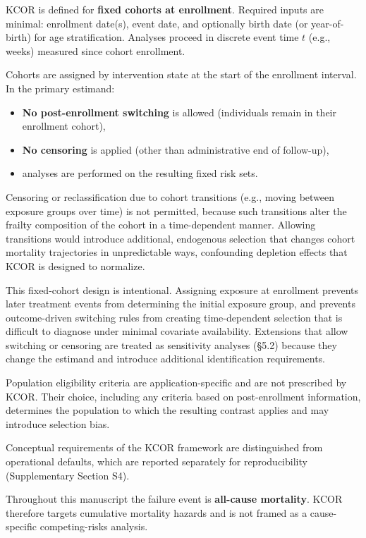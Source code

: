 \documentclass[
]{article}
\providecommand{\tightlist}{%
  \setlength{\itemsep}{0pt}\setlength{\parskip}{0pt}}
\begin{document}
KCOR is defined for \textbf{fixed cohorts at enrollment}. Required inputs are minimal: enrollment date(s), event date, and optionally birth date (or year-of-birth) for age stratification. Analyses proceed in discrete event time \(t\) (e.g., weeks) measured since cohort enrollment.

Cohorts are assigned by intervention state at the start of the enrollment interval. In the primary estimand:

\begin{itemize}
\tightlist
\item
  \textbf{No post-enrollment switching} is allowed (individuals remain in their enrollment cohort),
\item
  \textbf{No censoring} is applied (other than administrative end of follow-up),
\item
  analyses are performed on the resulting fixed risk sets.
\end{itemize}

Censoring or reclassification due to cohort transitions (e.g., moving between exposure groups over time) is not permitted, because such transitions alter the frailty composition of the cohort in a time-dependent manner. Allowing transitions would introduce additional, endogenous selection that changes cohort mortality trajectories in unpredictable ways, confounding depletion effects that KCOR is designed to normalize.

This fixed-cohort design is intentional. Assigning exposure at enrollment prevents later treatment events from determining the initial exposure group, and prevents outcome-driven switching rules from creating time-dependent selection that is difficult to diagnose under minimal covariate availability. Extensions that allow switching or censoring are treated as sensitivity analyses (§5.2) because they change the estimand and introduce additional identification requirements.

Population eligibility criteria are application-specific and are not prescribed by KCOR. Their choice, including any criteria based on post-enrollment information, determines the population to which the resulting contrast applies and may introduce selection bias.

Conceptual requirements of the KCOR framework are distinguished from operational defaults, which are reported separately for reproducibility (Supplementary Section S4).

Throughout this manuscript the failure event is \textbf{all-cause mortality}. KCOR therefore targets cumulative mortality hazards and is not framed as a cause-specific competing-risks analysis.
\end{document}
